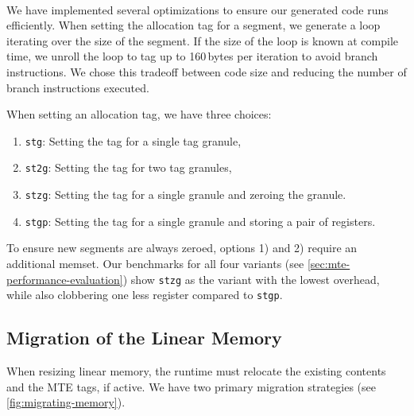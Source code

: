 \paragraph{}
We have implemented several optimizations to ensure our generated code runs efficiently.
When setting the allocation tag for a segment, we generate a loop iterating over the size of the segment.
If the size of the loop is known at compile time, we unroll the loop to tag up to 160\,bytes per iteration to avoid branch instructions.
We chose this tradeoff between code size and reducing the number of branch instructions executed.

When setting an allocation tag, we have three choices:
\begin{enumerate}
  \item \texttt{stg}: Setting the tag for a single tag granule,
  \item \texttt{st2g}: Setting the tag for two tag granules,
  \item \texttt{stzg}: Setting the tag for a single granule and zeroing the granule.
  \item \texttt{stgp}: Setting the tag for a single granule and storing a pair of registers.
\end{enumerate}

To ensure new segments are always zeroed, options 1) and 2) require an additional memset.
Our benchmarks for all four variants (see \cref{sec:mte-performance-evaluation}) show \texttt{stzg} as the variant with the lowest overhead, while also clobbering one less register compared to \texttt{stgp}.

\subsection{Migration of the Linear Memory}
\label{subsec:migration-of-the-linear-memory}

When resizing linear memory, the runtime must relocate the existing contents and the \ac{MTE} tags, if active.
We have two primary migration strategies (see \cref{fig:migrating-memory}).

